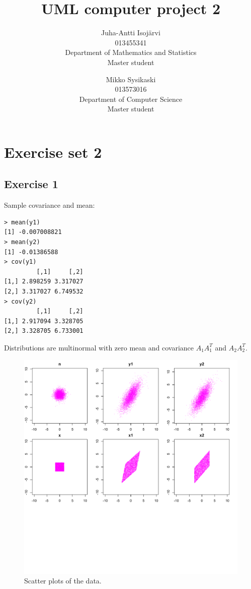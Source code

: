 \documentclass{article}
\begin{document}
\title{UML computer project 2}
\author{
Juha-Antti Isojärvi\\
013455341 \\
Department of Mathematics and Statistics\\
Master student
\and
Mikko Sysikaski\\
013573016\\
Department of Computer Science\\
Master student}
\date{}
\maketitle

\section{Exercise set 2}
\subsection{Exercise 1}
Sample covariance and mean:
\begin{verbatim}
> mean(y1)
[1] -0.007008821
> mean(y2)
[1] -0.01386588
> cov(y1)
         [,1]     [,2]
[1,] 2.898259 3.317027
[2,] 3.317027 6.749532
> cov(y2)
         [,1]     [,2]
[1,] 2.917094 3.328705
[2,] 3.328705 6.733001
\end{verbatim}
Distributions are multinormal with zero mean and covariance $A_1A_1^T$
and $A_2A_2^T$. 

\begin{figure}\centering
	\includegraphics{scatterPlotE21.pdf}
	\caption{Scatter plots of the data.} \label{fig:scatterE21}
\end{figure}
\end{document}
